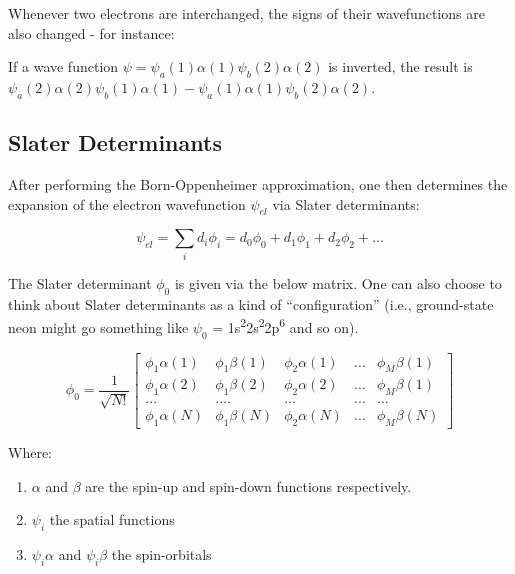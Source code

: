 \documentclass[
  letterpaper,
  DIV=11,
  numbers=noendperiod]{scrreprt}
\providecommand{\tightlist}{%
  \setlength{\itemsep}{0pt}\setlength{\parskip}{0pt}}\usepackage{longtable,booktabs,array}
\begin{document}
Whenever two electrons are interchanged, the signs of their
wavefunctions are also changed - for instance:

If a wave function \(\psi = \psi_a(1)\alpha(1)\psi_b(2)\alpha(2)\) is
inverted, the result is
\(\psi_a(2)\alpha(2)\psi_b(1)\alpha(1) - \psi_a(1)\alpha(1)\psi_b(2)\alpha(2)\).

\hypertarget{slater-determinants}{%
\subsection{Slater Determinants}\label{slater-determinants}}

After performing the Born-Oppenheimer approximation, one then determines
the expansion of the electron wavefunction \(\psi_{el}\) via Slater
determinants:

\begin{equation}
  \psi_{el} = \sum_id_i\phi_i = d_0\phi_0 + d_1\phi_1 + d_2\phi_2 + ...
\end{equation}

The Slater determinant \(\phi_0\) is given via the below matrix. One can
also choose to think about Slater determinants as a kind of
``configuration'' (i.e., ground-state neon might go something like
\(\psi_0\) =
1s\textsuperscript{2}2s\textsuperscript{2}2p\textsuperscript{6} and so
on).

\begin{equation}
  \phi_0 = \frac{1}{\sqrt{N!}}\left[
  \begin{matrix}
    \phi_1\alpha(1) & \phi_1\beta(1) & \phi_2\alpha(1) & ... & \phi_M\beta(1) \\
    \phi_1\alpha(2) & \phi_1\beta(2) & \phi_2\alpha(2) & ... & \phi_M\beta(1) \\ 
    ... & .... & ... & ... & ... \\ 
    \phi_1\alpha(N) & \phi_1\beta(N) & \phi_2\alpha(N) & ... & \phi_M\beta(N)    
  \end{matrix}
  \right]
\end{equation}

Where:

\begin{enumerate}
\def\labelenumi{\arabic{enumi}.}
\tightlist
\item
  \(\alpha\) and \(\beta\) are the spin-up and spin-down functions
  respectively.
\item
  \(\psi_i\) the spatial functions
\item
  \(\psi_i\alpha\) and \(\psi_i\beta\) the spin-orbitals
\end{enumerate}
\end{document}

